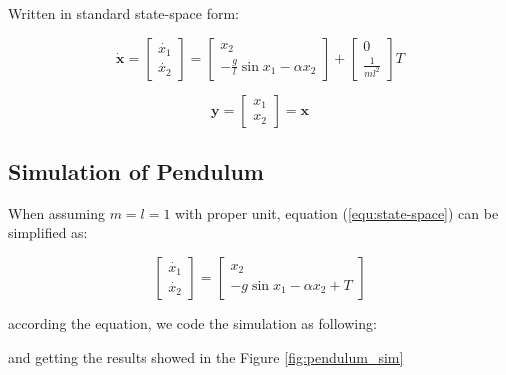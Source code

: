 \documentclass{article}
\begin{document}
Written in standard state-space form:

\begin{equation}
    \bm{\dot{x}} = 
    \begin{bmatrix}
        \dot{x_1} \\ \dot{x_2}
    \end{bmatrix}
    =
    \begin{bmatrix}
        x_2 \\ -\frac{g}{l}\sin{x_1} - \alpha x_2
    \end{bmatrix}
    +
    \begin{bmatrix}
        0 \\ \frac{1}{ml^2}
    \end{bmatrix}
    T
    \label{equ:state-space}
\end{equation}

\begin{equation}
    \bm{y} = 
    \begin{bmatrix}
        x_1 \\ x_2
    \end{bmatrix}
    = \bm{x}
\end{equation}

\subsection{Simulation of Pendulum}

When assuming $m=l=1$ with proper unit, equation (\ref{equ:state-space}) can be simplified as:

\begin{equation}
    \begin{bmatrix}
        \dot{x_1} \\ \dot{x_2}
    \end{bmatrix}
    =
    \begin{bmatrix}
        x_2 \\ -g\sin{x_1} - \alpha x_2 + T
    \end{bmatrix}
\end{equation}

according the equation, we code the simulation as following:



and getting the results showed in the Figure \ref{fig:pendulum_sim}
\end{document}
